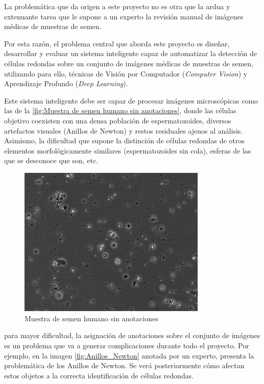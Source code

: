 \documentclass[12pt,a4paper,onecolumn,oneside]{report}
\begin{document}
La problemática que da origen a este proyecto no es otra que la ardua y extenuante tarea que le supone a un experto la revisión manual de imágenes médicas de muestras de semen.

Por esta razón, el problema central que aborda este proyecto es diseñar, desarrollar y evaluar un sistema inteligente capaz de automatizar la detección de células 
redondas sobre un conjunto de imágenes médicas de muestras de semen, utilizando para ello, técnicas de Visión por Computador (\textit{Computer Vision}) y Aprendizaje Profundo (\textit{Deep Learning}).

Este sistema inteligente debe ser capaz de procesar imágenes microscópicas como las de la \autoref{fig:Muestra de semen humano sin anotaciones}, donde las células objetivo coexisten con una densa población de espermatozoides, diversos artefactos visuales (Anillos de Newton)
y restos residuales ajenos al análisis. Asimismo, la dificultad que supone la distinción de células redondas de otros elementos morfológicamente similares (espermatozoides sin cola), esferas de las que se desconoce que son, etc.

\begin{figure}[H]
  \centering
  \includegraphics[width=0.8\textwidth]{figuras/rounds_cells/61.jpg}
  \caption{Muestra de semen humano sin anotaciones}
  \label{fig:Muestra de semen humano sin anotaciones}
\end{figure}

para mayor dificultad, la asignación de anotaciones sobre el conjunto de imágenes es un problema que va a generar complicaciones durante todo el proyecto. Por ejemplo,
en la imagen \ref{fig:Anillos_Newton} anotada por un experto, presenta la problemática de los Anillos de Newton. Se verá posteriormente cómo afectan estos objetos a la correcta identificación de células redondas.
\end{document}
